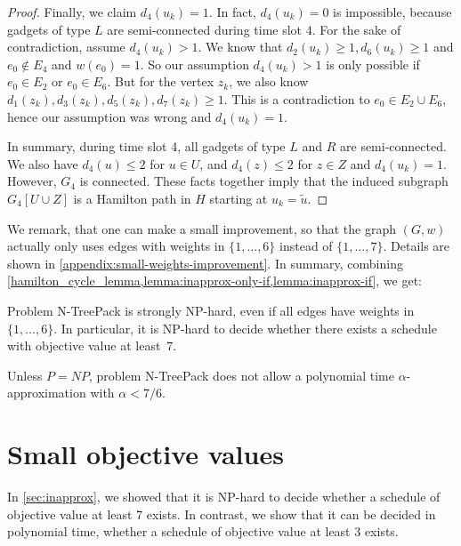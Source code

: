 \documentclass[runningheads]{llncs}
\newcommand{\set}[1]{\{ #1 \}}
\newcommand{\fromto}[2]{\set{#1, \ldots, #2}}
\newcommand{\xxxNTP}{{\sc N-TreePack}}
\begin{document}
\begin{proof}
Finally, we claim $d_4(u_k) = 1$. In fact, $d_4(u_k) = 0$ is impossible, because gadgets of type $L$ are semi-connected during time slot 4. For the sake of contradiction, assume $d_4(u_k) > 1$. We know that $d_2(u_k) \geq 1, d_6(u_k) \geq 1$ and $e_0 \not\in E_4$ and $w(e_0) = 1$. So our assumption $d_4(u_k) > 1$ is only possible if $e_0 \in E_2$ or $e_0 \in E_6$. But for the vertex $z_k$, we also know $d_1(z_k), d_3(z_k), d_5(z_k), d_7(z_k) \geq 1$. This is a contradiction to $e_0 \in E_2 \cup E_6$, hence our assumption was wrong and $d_4(u_k) = 1$.

In summary, during time slot 4, all gadgets of type $L$ and $R$ are semi-connected. We also have $d_4(u) \leq 2$ for $u \in U$, and $d_4(z) \leq 2$ for $z \in Z$ and $d_4(u_k) = 1$. However, $G_4$ is connected. These facts together imply that the induced subgraph $G_4[U \cup Z]$ is a Hamilton path in $H$ starting at $u_k = \tilde{u}$.
\end{proof}

We remark, that one can make a small improvement, so that the graph $(G, w)$ actually only uses edges with weights in $\fromto{1}{6}$ instead of $\fromto{1}{7}$. Details are shown in \cref{appendix:small-weights-improvement}. In summary, combining \cref{hamilton_cycle_lemma,lemma:inapprox-only-if,lemma:inapprox-if}, we get:

\begin{theorem}
\label{th:small-weights}
Problem {\xxxNTP} is strongly NP-hard, even if all edges have weights in $\fromto{1}{6}$.
In particular, it is NP-hard to decide whether there exists a schedule with objective value at least~$7$.
\end{theorem}

\begin{corollary}
\label{coro:inapproximability}
Unless $P=NP$, problem {\xxxNTP} does not allow a polynomial time $\alpha$-approximation 
with $\alpha<7/6$.
\end{corollary}

\section{Small objective values}
\label{sec:small-objective}
In \cref{sec:inapprox}, we showed that it is NP-hard to decide whether a schedule of objective value at least 7 exists. In contrast, we show that it can be decided in polynomial time, whether a schedule of objective value at least 3 exists.
\end{document}
